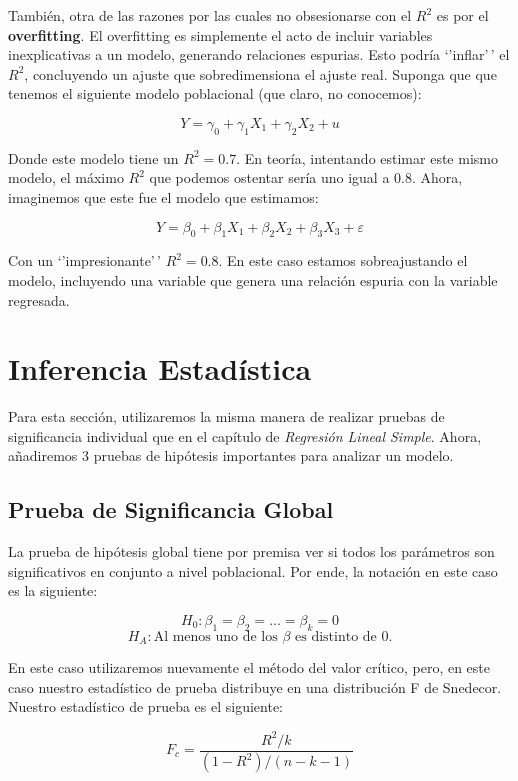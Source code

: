 \documentclass[
]{book}
\begin{document}
También, otra de las razones por las cuales no obsesionarse con el \(R^2\) es por el \textbf{overfitting}. El overfitting es simplemente el acto de incluir variables inexplicativas a un modelo, generando relaciones espurias. Esto podría `'inflar'\,' el \(R^2\), concluyendo un ajuste que sobredimensiona el ajuste real. Suponga que que tenemos el siguiente modelo poblacional (que claro, no conocemos):

\[
Y = \gamma_0 + \gamma_1X_1 + \gamma_2X_2 + u
\]

Donde este modelo tiene un \(R^2 = 0.7\). En teoría, intentando estimar este mismo modelo, el máximo \(R^2\) que podemos ostentar sería uno igual a \(0.8\). Ahora, imaginemos que este fue el modelo que estimamos:

\[
Y = \beta_0 + \beta_1X_1 + \beta_2X_2 + \beta_3X_3 + \varepsilon
\]

Con un `'impresionante'\,' \(R^2 = 0.8\). En este caso estamos sobreajustando el modelo, incluyendo una variable que genera una relación espuria con la variable regresada.

\section{Inferencia Estadística}\label{inferencia-estaduxedstica-1}

Para esta sección, utilizaremos la misma manera de realizar pruebas de significancia individual que en el capítulo de \textit{Regresión Lineal Simple}. Ahora, añadiremos 3 pruebas de hipótesis importantes para analizar un modelo.

\subsection{Prueba de Significancia Global}\label{prueba-de-significancia-global}

La prueba de hipótesis global tiene por premisa ver si todos los parámetros son significativos en conjunto a nivel poblacional. Por ende, la notación en este caso es la siguiente:

\[H_0: \beta_1 = \beta_2 = ... = \beta_k = 0\]
\[H_A: \text{Al menos uno de los $\beta$ es distinto de 0.}\]

En este caso utilizaremos nuevamente el método del valor crítico, pero, en este caso nuestro estadístico de prueba distribuye en una distribución F de Snedecor. Nuestro estadístico de prueba es el siguiente:

\[
F_c = \frac{R^2/k}{(1-R^2)/(n-k-1)}
\]
\end{document}
